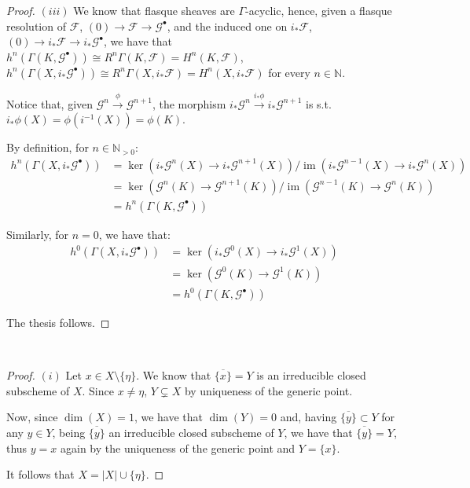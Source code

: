 \documentclass{article}
\newcommand{\numberset}{\mathbb}
\newcommand{\N}{\numberset{N}}
\newcommand{\exercise}[1]{\noindent {\bf Exercise #1}}
\DeclareMathOperator{\im}{im}
\begin{document}
\begin{proof}
    $(iii)$ We know that flasque sheaves are $\Gamma$-acyclic, hence, given a
    flasque resolution of $\mathcal{F}$,
    $(0)\rightarrow\mathcal{F}\rightarrow\mathcal{G}^\bullet$, and the induced
    one on $i_*\mathcal{F}$, $(0)\rightarrow i_*\mathcal{F}\rightarrow
    i_*\mathcal{G}^\bullet$, we have that $h^n(\Gamma(K,\mathcal{G}^\bullet))\cong
    R^n\Gamma(K,\mathcal{F})=H^n(K,\mathcal{F})$,
    $h^n(\Gamma(X,i_*\mathcal{G}^\bullet))
    \cong R^n\Gamma(X,i_*\mathcal{F})=H^n(X,i_*\mathcal{F})$ for every $n\in\N$.

    Notice that, given $\mathcal{G}^n\xrightarrow{\phi}\mathcal{G}^{n+1}$, the
    morphism $i_*\mathcal{G}^n\xrightarrow{i_*\phi}i_*\mathcal{G}^{n+1}$ is
    s.t. $i_*\phi(X)=\phi(i^{-1}(X))=\phi(K)$.

    By definition, for $n\in\N_{>0}$:
    \begin{align*}
        h^n(\Gamma(X,i_*\mathcal{G}^\bullet))&=\ker(i_*\mathcal{G}^n(X)\rightarrow
        i_*\mathcal{G}^{n+1}(X))/\im(i_*\mathcal{G}^{n-1}(X)\rightarrow
        i_*\mathcal{G}^n(X)) \\
        &=\ker(\mathcal{G}^n(K)\rightarrow\mathcal{G}^{n+1}(K))/
        \im(\mathcal{G}^{n-1}(K)\rightarrow\mathcal{G}^n(K)) \\
        &=h^n(\Gamma(K,\mathcal{G}^\bullet)
    )\end{align*}

    Similarly, for $n=0$, we have that:
    \begin{align*}
        h^0(\Gamma(X,i_*\mathcal{G}^\bullet))&=\ker(i_*\mathcal{G}^0(X)\rightarrow
    i_*\mathcal{G}^1(X)) \\
        &=\ker(\mathcal{G}^0(K)\rightarrow\mathcal{G}^1(K)) \\
        &=h^0(\Gamma(K,\mathcal{G}^\bullet))
    \end{align*}

    The thesis follows.
\end{proof}


~\\
\exercise{2}

\begin{proof}
    $(i)$ Let $x\in X\setminus\{\eta\}$. We know that $\overline{\{x\}}=Y$ is an
    irreducible closed subscheme of $X$. Since $x\neq\eta$, $Y\subsetneq X$ by
    uniqueness of the generic point.

    Now, since $\dim(X)=1$, we have that $\dim(Y)=0$ and, having
    $\overline{\{y\}}\subset Y$ for any $y\in Y$, being $\overline{\{y\}}$ an
    irreducible closed subscheme of $Y$, we have that $\overline{\{y\}}=Y$, thus
    $y=x$ again by the uniqueness of the generic point and $Y=\{x\}$.

    It follows that $X=|X|\cup\{\eta\}$.
\end{proof}
\end{document}
